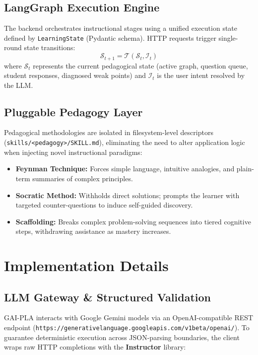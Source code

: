 \documentclass[12pt,a4paper]{article}
\begin{document}
\subsection{LangGraph Execution Engine}
The backend orchestrates instructional stages using a unified execution state defined by \texttt{LearningState} (Pydantic schema). HTTP requests trigger single-round state transitions:
\begin{equation}
\mathcal{S}_{t+1} = \mathcal{T}(\mathcal{S}_t, \mathcal{I}_t)
\end{equation}
where $\mathcal{S}_t$ represents the current pedagogical state (active graph, question queue, student responses, diagnosed weak points) and $\mathcal{I}_t$ is the user intent resolved by the LLM.

\subsection{Pluggable Pedagogy Layer}
Pedagogical methodologies are isolated in filesystem-level descriptors (\texttt{skills/<pedagogy>/SKILL.md}), eliminating the need to alter application logic when injecting novel instructional paradigms:
\begin{itemize}
    \item \textbf{Feynman Technique:} Forces simple language, intuitive analogies, and plain-term summaries of complex principles.
    \item \textbf{Socratic Method:} Withholds direct solutions; prompts the learner with targeted counter-questions to induce self-guided discovery.
    \item \textbf{Scaffolding:} Breaks complex problem-solving sequences into tiered cognitive steps, withdrawing assistance as mastery increases.
\end{itemize}

\section{Implementation Details}

\subsection{LLM Gateway \& Structured Validation}
GAI-PLA interacts with Google Gemini models via an OpenAI-compatible REST endpoint (\texttt{https://generativelanguage.googleapis.com/v1beta/openai/}). To guarantee deterministic execution across JSON-parsing boundaries, the client wraps raw HTTP completions with the \textbf{Instructor} library:
\end{document}
